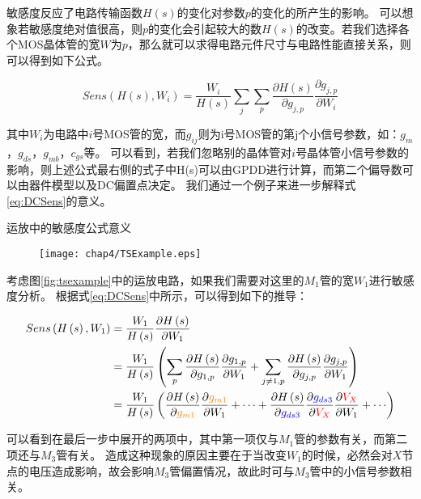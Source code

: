 敏感度反应了电路传输函数$H\left(s\right)$的变化对参数$p$的变化的所产生的影响。
可以想象若敏感度绝对值很高，则$p$的变化会引起较大的数$H\left(s\right)$的改变。若我们选择各个MOS晶体管的宽$W$为$p$，那么就可以求得电路元件尺寸与电路性能直接关系，则可以得到如下公式。

\begin{equation}\label{eq:DCSens}
Sens\left( {H\left( s \right),{W_i}} \right) = \frac{{{W_i}}}{{H\left( s \right)}} \sum\limits_{j} \sum\limits_{p} {\frac{{\partial H\left( s \right)}}{{\partial {g_{j,p}}}}\frac{{\partial {g_{j,p}}}}{{\partial {W_i}}}}
\end{equation}

其中$W_i$为电路中$i$号MOS管的宽，而$g_{ij}$则为i号MOS管的第j个小信号参数，如：$g_m$，$g_{ds}$，$g_{mb}$，$c_{gs}$等。
可以看到，若我们忽略别的晶体管对$i$号晶体管小信号参数的影响，则上述公式最右侧的式子中H(s)可以由GPDD进行计算，而第二个偏导数可以由器件模型以及DC偏置点决定。
我们通过一个例子来进一步解释式\ref{eq:DCSens}的意义。

\begin{exmp}
	运放中的敏感度公式意义
	
	\begin{figure}[!htp]
		\centering
		\texttt{[image: chap4/TSExample.eps]}
	\end{figure}
	
	考虑图\ref{fig:tsexample}中的运放电路，如果我们需要对这里的$M_1$管的宽$W_1$进行敏感度分析。
	根据式\ref{eq:DCSens}中所示，可以得到如下的推导：
	
	\begin{align}
		Sens\left( {H\left( s \right),{W_1}} \right) &= \frac{{{W_1}}}
		{{H\left( s \right)}}\frac{{\partial H\left( s \right)}}
		{{\partial {W_1}}} \nonumber \\ 
		&= \frac{{{W_1}}}
		{{H\left( s \right)}}\left( {\sum\limits_p {\frac{{\partial H\left( s \right)}}
				{{\partial {g_{1,p}}}}\frac{{\partial {g_{1,p}}}}
				{{\partial {W_1}}}}  + \sum\limits_{j \ne 1,p} {\frac{{\partial H\left( s \right)}}
				{{\partial {g_{j,p}}}}\frac{{\partial {g_{j,p}}}}
				{{\partial {W_1}}}} } \right) \nonumber \\ 
		&= \frac{{{W_1}}}
		{{H\left( s \right)}}\left( {\frac{{\partial H\left( s \right)}}
			{{\partial {\textcolor{orange}{g_{m1}}}}}\frac{{\partial {\textcolor{orange}{g_{m1}}}}}
			{{\partial {W_1}}} +  \cdots  + \frac{{\partial H\left( s \right)}}
			{{\partial {\textcolor{blue}{g_{ds3}}}}}\frac{{\partial {\textcolor{blue}{g_{ds3}}}}}
			{{\partial {\textcolor{red}{V_X}}}}\frac{{\partial {\textcolor{red}{V_X}}}}
			{{\partial {W_1}}} +  \cdots } \right)
	\end{align}
	
	可以看到在最后一步中展开的两项中，其中第一项仅与$M_1$管的参数有关，而第二项还与$M_3$管有关。
	造成这种现象的原因主要在于当改变$W_1$的时候，必然会对$X$节点的电压造成影响，故会影响$M_3$管偏置情况，故此时可与$M_3$管中的小信号参数相关。
	
\end{exmp}

